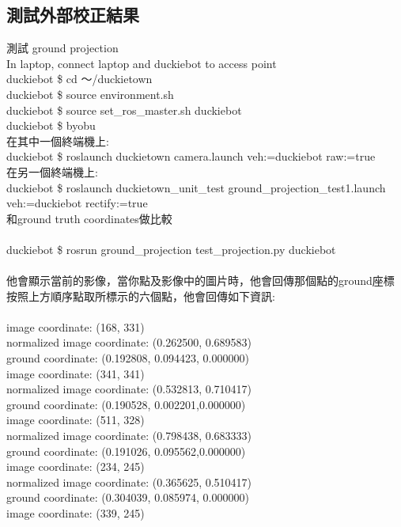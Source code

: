 \documentclass{article}
\begin{document}
\subsection{測試外部校正結果}

測試 ground projection
\\In laptop, connect laptop and duckiebot to access point
\\duckiebot \$ cd ～/duckietown
\\duckiebot \$ source environment.sh
\\duckiebot \$ source set\_ros\_master.sh duckiebot
\\duckiebot \$ byobu
\\在其中一個終端機上:
\\duckiebot \$ roslaunch duckietown camera.launch veh:=duckiebot raw:=true
\\在另一個終端機上:
\\duckiebot \$ roslaunch duckietown\_unit\_test ground\_projection\_test1.launch veh:=duckiebot  rectify:=true
\\和ground truth coordinates做比較
\\
\\duckiebot \$ rosrun ground\_projection test\_projection.py duckiebot
\\
\\他會顯示當前的影像，當你點及影像中的圖片時，他會回傳那個點的ground座標
\\
按照上方順序點取所標示的六個點，他會回傳如下資訊:
\\
\\image coordinate: (168, 331)
\\normalized image coordinate: (0.262500, 0.689583)
\\ground coordinate: (0.192808, 0.094423, 0.000000)
\\image coordinate: (341, 341)
\\normalized image coordinate: (0.532813, 0.710417)
\\ground coordinate: (0.190528, 0.002201,0.000000)
\\image coordinate: (511, 328)
\\normalized image coordinate: (0.798438, 0.683333)
\\ground coordinate: (0.191026, 0.095562,0.000000)
\\image coordinate: (234, 245)
\\normalized image coordinate: (0.365625, 0.510417)
\\ground coordinate: (0.304039, 0.085974, 0.000000)
\\image coordinate: (339, 245)
\end{document}
